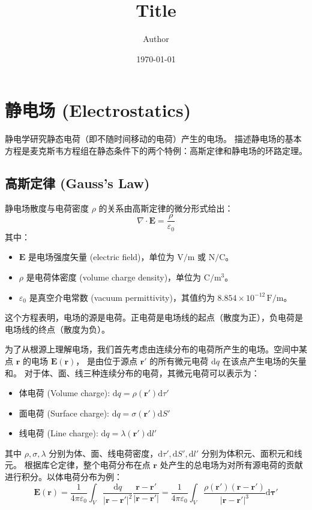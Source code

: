 \documentclass[fontset=none]{ctexart}
\title{Title}
\author{Author}
\date{\today}
\begin{document}

\section{静电场 (Electrostatics)}
静电学研究静态电荷（即不随时间移动的电荷）产生的电场。
描述静电场的基本方程是麦克斯韦方程组在静态条件下的两个特例：高斯定律和静电场的环路定理。

\subsection{高斯定律 (Gauss's Law)}
\begin{law}
    静电场散度与电荷密度 $\rho$ 的关系由高斯定律的微分形式给出：
    \begin{equation}
        \nabla \cdot \bm{E} = \frac{\rho}{\varepsilon_0}
    \end{equation}
    其中：
    \begin{itemize}
        \item $\bm{E}$ 是电场强度矢量 (electric field)，单位为 $\mathrm{V/m}$ 或 $\mathrm{N/C}$。
        \item $\rho$ 是电荷体密度 (volume charge density)，单位为 $\mathrm{C/m^3}$。
        \item $\varepsilon_0$ 是真空介电常数 (vacuum permittivity)，其值约为 $8.854 \times 10^{-12} \, 
        \mathrm{F/m}$。
    \end{itemize}
    这个方程表明，电场的源是电荷。正电荷是电场线的起点（散度为正），负电荷是电场线的终点（散度为负）。
\end{law}

为了从根源上理解电场，我们首先考虑由连续分布的电荷所产生的电场。空间中某点 $\bm{r}$ 的电场 $\bm{E}(\bm{r})$，
是由位于源点 $\bm{r'}$ 的所有微元电荷 $\mathrm{d}q$ 在该点产生电场的矢量和。
对于体、面、线三种连续分布的电荷，其微元电荷可以表示为：
\begin{itemize}
    \item 体电荷 (Volume charge): $\mathrm{d}q = \rho(\bm{r'}) \mathrm{d}\tau'$
    \item 面电荷 (Surface charge): $\mathrm{d}q = \sigma(\bm{r'}) \mathrm{d}S'$
    \item 线电荷 (Line charge): $\mathrm{d}q = \lambda(\bm{r'}) \mathrm{d}l'$
\end{itemize}
其中 $\rho, \sigma, \lambda$ 分别为体、面、线电荷密度，$\mathrm{d}\tau', \mathrm{d}S', 
\mathrm{d}l'$ 分别为体积元、面积元和线元。
根据库仑定律，整个电荷分布在点 $\bm{r}$ 处产生的总电场为对所有源电荷的贡献进行积分。以体电荷分布为例：
\begin{equation}
    \bm{E}(\bm{r}) = \frac{1}{4\pi\varepsilon_0} \int_V \frac{\mathrm{d}q}{|\bm{r}-\bm{r'}|^2} 
    \frac{\bm{r}-\bm{r'}}{|\bm{r}-\bm{r'}|} = \frac{1}{4\pi\varepsilon_0} 
    \int_V \frac{\rho(\bm{r'})(\bm{r}-\bm{r'})}{|\bm{r}-\bm{r'}|^3} \mathrm{d}\bm{\tau'}
\end{equation}
\end{document}
